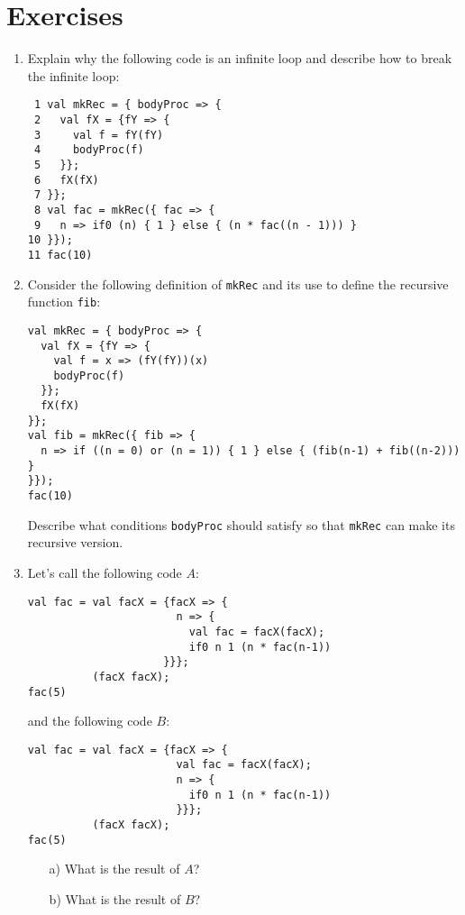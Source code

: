 \section{Exercises}

\begin{enumerate}
\item Explain why the following code is an infinite loop and describe how to break the infinite loop:

\begin{verbatim}
 1 val mkRec = { bodyProc => {
 2   val fX = {fY => {
 3     val f = fY(fY)
 4     bodyProc(f)
 5   }};
 6   fX(fX)
 7 }};
 8 val fac = mkRec({ fac => {
 9   n => if0 (n) { 1 } else { (n * fac((n - 1))) }
10 }});
11 fac(10)
\end{verbatim}

\item Consider the following definition of \texttt{mkRec} and its use to define the recursive
function \texttt{fib}:

\begin{verbatim}
val mkRec = { bodyProc => {
  val fX = {fY => {
    val f = x => (fY(fY))(x)
    bodyProc(f)
  }};
  fX(fX)
}};
val fib = mkRec({ fib => {
  n => if ((n = 0) or (n = 1)) { 1 } else { (fib(n-1) + fib((n-2))) }
}});
fac(10)
\end{verbatim}

Describe what conditions \texttt{bodyProc} should satisfy so that \texttt{mkRec} can make its recursive version.

\item Let's call the following code $A$:
\begin{verbatim}
val fac = val facX = {facX => {
                       n => {
                         val fac = facX(facX);
                         if0 n 1 (n * fac(n-1))
                     }}};
          (facX facX);
fac(5)
\end{verbatim}
and the following code $B$:
\begin{verbatim}
val fac = val facX = {facX => {
                       val fac = facX(facX);
                       n => {
                         if0 n 1 (n * fac(n-1))
                       }}};
          (facX facX);
fac(5)
\end{verbatim}

\begin{itemize}
  \item[a)] What is the result of $A$?
  \item[b)] What is the result of $B$?
\end{itemize}


\end{enumerate}
